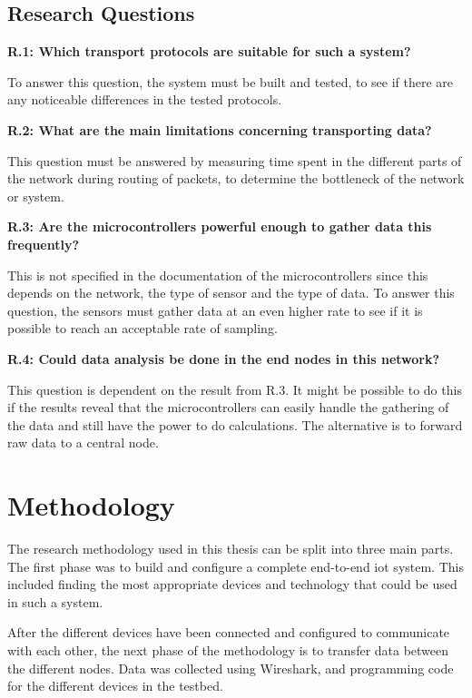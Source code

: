 \subsection{Research Questions}

\noindent \textbf{R.1: Which transport protocols are suitable for such a system?}

\noindent To answer this question, the system must be built and tested, to see if there are any noticeable differences in the tested protocols.

\noindent\textbf{R.2: What are the main limitations concerning transporting data?}

\noindent This question must be answered by measuring time spent in the different parts of the network during routing of packets, to determine the bottleneck of the network or system. 

\noindent\textbf{R.3: Are the \glspl{microcontroller} powerful enough to gather data this frequently?}

\noindent This is not specified in the documentation of the \glspl{microcontroller} since this depends on the network, the type of sensor and the type of data. To answer this question, the sensors must gather data at an even higher rate to see if it is possible to reach an acceptable rate of sampling. 

\noindent\textbf{R.4: Could data analysis be done in the end nodes in this network?}

\noindent This question is dependent on the result from R.3. It might be possible to do this if the results reveal that the \glspl{microcontroller} can easily handle the gathering of the data and still have the power to do calculations. The alternative is to forward raw data to a central node. 

\section{Methodology}

The research methodology used in this thesis can be split into three main parts. The first phase was to build and configure a complete end-to-end \gls{iot} system. This included finding the most appropriate devices and technology that could be used in such a system. 

After the different devices have been connected and configured to communicate with each other, the next phase of the methodology is to transfer data between the different nodes. Data was collected using Wireshark, and programming code for the different devices in the testbed. 

